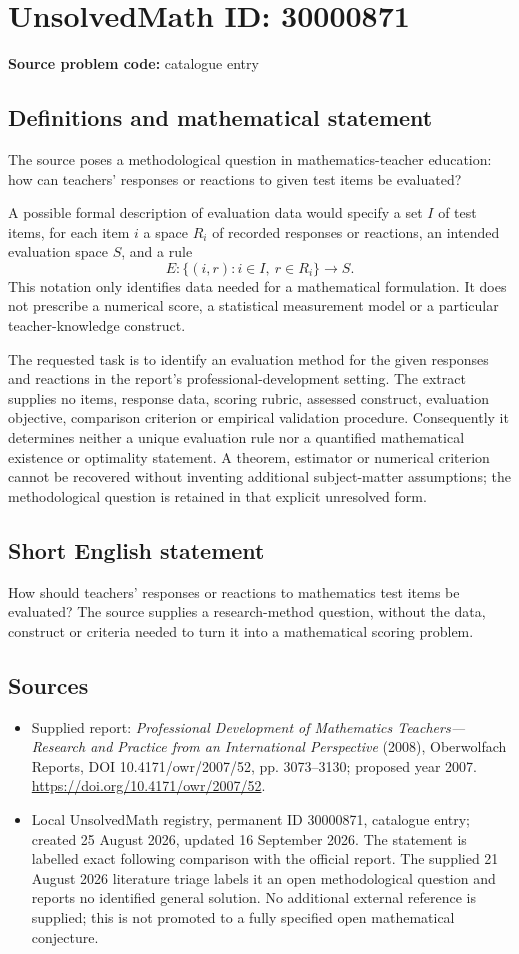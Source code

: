 \documentclass[11pt]{article}
\begin{document}
\section*{UnsolvedMath ID: 30000871}
\textbf{Source problem code:} catalogue entry
\subsection{Definitions and mathematical statement}
The source poses a methodological question in mathematics-teacher education: how can teachers' responses or reactions to given test items be evaluated?

A possible formal description of evaluation data would specify a set $I$ of test items, for each item $i$ a space $R_i$ of recorded responses or reactions, an intended evaluation space $S$, and a rule
\[
E:\{(i,r):i\in I,\ r\in R_i\}\longrightarrow S.
\]
This notation only identifies data needed for a mathematical formulation. It does not prescribe a numerical score, a statistical measurement model or a particular teacher-knowledge construct.

The requested task is to identify an evaluation method for the given responses and reactions in the report's professional-development setting. The extract supplies no items, response data, scoring rubric, assessed construct, evaluation objective, comparison criterion or empirical validation procedure. Consequently it determines neither a unique evaluation rule nor a quantified mathematical existence or optimality statement. A theorem, estimator or numerical criterion cannot be recovered without inventing additional subject-matter assumptions; the methodological question is retained in that explicit unresolved form.
\subsection{Short English statement}
How should teachers' responses or reactions to mathematics test items be evaluated? The source supplies a research-method question, without the data, construct or criteria needed to turn it into a mathematical scoring problem.
\subsection{Sources}
\begin{itemize}
\item Supplied report: \emph{Professional Development of Mathematics Teachers---Research and Practice from an International Perspective} (2008), Oberwolfach Reports, DOI 10.4171/owr/2007/52, pp. 3073--3130; proposed year 2007. \url{https://doi.org/10.4171/owr/2007/52}.
\item Local UnsolvedMath registry, permanent ID 30000871, catalogue entry; created 25 August 2026, updated 16 September 2026. The statement is labelled exact following comparison with the official report. The supplied 21 August 2026 literature triage labels it an open methodological question and reports no identified general solution. No additional external reference is supplied; this is not promoted to a fully specified open mathematical conjecture.
\end{itemize}
\end{document}
